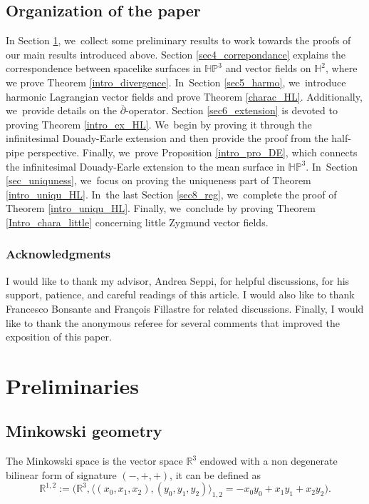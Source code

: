 \documentclass[11pt]{article}
\theoremstyle{plain}
\theoremstyle{definition}
\newcommand{\minko}{\mathbb{R}^{1,2}}
\newcommand{\HP}{\mathbb{HP}^3}
\newcommand{\inner}[1] {\langle #1 \rangle}
\begin{document}
\subsection{Organization of the paper}
In Section \ref{section3}, we~collect some preliminary results to work towards the proofs of our main results introduced above. Section \ref{sec4_correpondance} explains the correspondence between spacelike surfaces in \(\HP \) and vector fields on \(\mathbb{H}^2 \), where we prove Theorem \ref{intro_divergence}. In~Section \ref{sec5_harmo}, we~introduce harmonic Lagrangian vector fields and prove Theorem \ref{charac_HL}. Additionally, we~provide details on the \(\overline{\partial}\)-operator. Section \ref{sec6_extension} is devoted to proving Theorem \ref{intro_ex_HL}. We~begin by proving it through the infinitesimal Douady-Earle extension and then provide the proof from the half-pipe perspective. Finally, we~prove Proposition \ref{intro_pro_DE}, which connects the infinitesimal Douady-Earle extension to the mean surface in \(\HP \). In~Section \ref{sec_uniquness}, we~focus on proving the uniqueness part of Theorem \ref{intro_uniqu_HL}. In~the last Section \ref{sec8_reg}, we~complete the proof of Theorem \ref{intro_uniqu_HL}. Finally, we~conclude by proving Theorem \ref{Intro_chara_little} concerning little Zygmund vector fields.

\subsubsection*{Acknowledgments}

I would like to thank my advisor, Andrea Seppi, for helpful discussions, for his support, patience, and careful readings of this article. I would also like to thank Francesco Bonsante and François Fillastre for related discussions. Finally, I would like to thank the anonymous referee for several comments
that improved the exposition of this paper.


\section{Preliminaries}\label{section3}
\subsection{Minkowski geometry}
The Minkowski space is the vector space $\mathbb{R}^3$ endowed with a non degenerate bilinear form of signature $(-,+,+)$, it can be defined as
\[
\minko:=\bigl(\mathbb{R}^3, \inner{(x_0,x_1,x_2),(y_0,y_1,y_2)}_{1,2}=-x_0y_0+x_1y_1+x_2y_2\bigr).
\]
\end{document}
